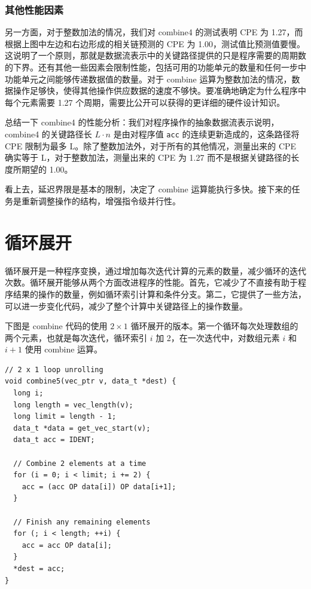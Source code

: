 \subsubsection{其他性能因素}

另一方面，对于整数加法的情况，我们对 combine4 的测试表明 CPE 为 1.27，而根据上图中左边和右边形成的相关链预测的 CPE 为 1.00，测试值比预测值要慢。这说明了一个原则，那就是数据流表示中的关键路径提供的只是程序需要的周期数的下界。还有其他一些因素会限制性能，包括可用的功能单元的数量和任何一步中功能单元之间能够传递数据值的数量。对于 combine 运算为整数加法的情况，数据操作足够快，使得其他操作供应数据的速度不够快。要准确地确定为什么程序中每个元素需要 1.27 个周期，需要比公开可以获得的更详细的硬件设计知识。

总结一下 combine4 的性能分析：我们对程序操作的抽象数据流表示说明，combine4 的关键路径长 $L \cdot n$ 是由对程序值 \verb|acc| 的连续更新造成的，这条路径将 CPE 限制为最多 L。除了整数加法外，对于所有的其他情况，测量出来的 CPE 确实等于 L，对于整数加法，测量出来的 CPE 为 1.27 而不是根据关键路径的长度所期望的 1.00。

看上去，延迟界限是基本的限制，决定了 combine 运算能执行多快。接下来的任务是重新调整操作的结构，增强指令级并行性。

\section{循环展开}

循环展开是一种程序变换，通过增加每次迭代计算的元素的数量，减少循环的迭代次数。循环展开能够从两个方面改进程序的性能。首先，它减少了不直接有助于程序结果的操作的数量，例如循环索引计算和条件分支。第二，它提供了一些方法，可以进一步变化代码，减少了整个计算中关键路径上的操作数量。

下图是 combine 代码的使用 $2 \times 1$ 循环展开的版本。第一个循环每次处理数组的两个元素，也就是每次迭代，循环索引 $i$ 加 2，在一次迭代中，对数组元素 $i$ 和 $i+1$ 使用 combine 运算。

\begin{verbatim}
// 2 x 1 loop unrolling
void combine5(vec_ptr v, data_t *dest) {
  long i;
  long length = vec_length(v);
  long limit = length - 1;
  data_t *data = get_vec_start(v);
  data_t acc = IDENT;

  // Combine 2 elements at a time
  for (i = 0; i < limit; i += 2) {
    acc = (acc OP data[i]) OP data[i+1];
  }

  // Finish any remaining elements
  for (; i < length; ++i) {
    acc = acc OP data[i];
  }
  *dest = acc;
}
\end{verbatim}

